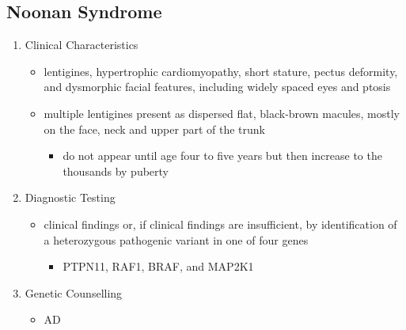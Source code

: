 \documentclass[12pt]{scrartcl}
\begin{document}
\subsection{Noonan Syndrome}
\label{sec:org1f50298}
\begin{enumerate}
\item Clinical Characteristics
\label{sec:org5f51ce5}
\begin{itemize}
\item lentigines, hypertrophic cardiomyopathy, short stature, pectus
deformity, and dysmorphic facial features, including widely spaced
eyes and ptosis
\item multiple lentigines present as dispersed flat, black-brown macules,
mostly on the face, neck and upper part of the trunk
\begin{itemize}
\item do not appear until age four to five years but then increase to
the thousands by puberty
\end{itemize}
\end{itemize}
\item Diagnostic Testing
\label{sec:orgebae02b}
\begin{itemize}
\item clinical findings or, if clinical findings are insufficient, by
identification of a heterozygous pathogenic variant in one of four
genes
\begin{itemize}
\item PTPN11, RAF1, BRAF, and MAP2K1
\end{itemize}
\end{itemize}
\item Genetic Counselling
\label{sec:orgccbfece}
\begin{itemize}
\item AD
\end{itemize}
\end{enumerate}
\end{document}
